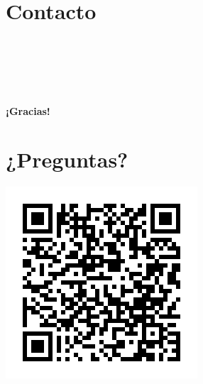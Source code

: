 \documentclass{presentacion}
\begin{document}
\usebackgroundtemplate{}%
\section{Contacto}
\begin{frame}
    \begin{center}
        \vspace{1em}
        \\
        \vspace{0.5em}
        \\
        \vspace{0.5em}
        \\
        \vspace{0.5em}
        \\
        \vspace{1em}
        
        \large\textbf{¡Gracias!}
    \end{center}
\end{frame}

\section{¿Preguntas?}
\begin{frame}
    \centering
    \includegraphics[height=0.8\textheight]{img/qr-code}
\end{frame}
\end{document}
